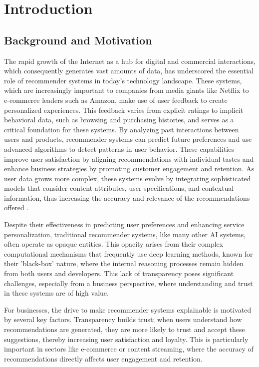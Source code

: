 \chapter{Introduction}
\label{chap:introduction}

\section{Background and Motivation}
The rapid growth of the Internet as a hub for digital and commercial
interactions, which consequently generates vast amounts of data, has underscored
the essential role of recommender systems in today's technology landscape. These
systems, which are increasingly important to companies from media giants like
Netflix to e-commerce leaders such as Amazon, make use of user feedback to create
personalized experiences. This feedback varies from explicit ratings to implicit
behavioral data, such as browsing and purchasing histories, and serves as a
critical foundation for these systems. By analyzing past interactions between users
and products, recommender systems can predict future preferences and use
advanced algorithms to detect patterns in user behavior. These capabilities improve
user satisfaction by aligning recommendations with individual tastes and enhance
business strategies by promoting customer engagement and retention. As user data
grows more complex, these systems evolve by integrating sophisticated models that
consider content attributes, user specifications, and contextual information,
thus increasing the accuracy and relevance of the recommendations offered
\parencite{aggarwal_recommender_2016}.

Despite their effectiveness in predicting user preferences and enhancing service
personalization, traditional recommender systems, like many other AI systems, often operate as opaque
entities. This opacity arises from their complex computational mechanisms that frequently
use deep learning methods, known for their 'black-box' nature, where the internal
reasoning processes remain hidden from both users and developers. This lack of
transparency poses significant challenges, especially from a business perspective,
where understanding and trust in these systems are of high value.

For businesses, the drive to make recommender systems explainable is motivated by
several key factors. Transparency builds trust; when users understand how recommendations
are generated, they are more likely to trust and accept these suggestions, thereby
increasing user satisfaction and loyalty. This is particularly important in
sectors like e-commerce or content streaming, where the accuracy of recommendations
directly affects user engagement and retention.

